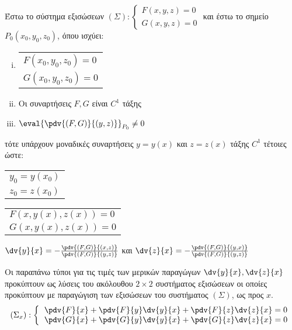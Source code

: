 \documentclass[a4paper,table]{report}
\begin{document}
Έστω το σύστημα εξισώσεων $(\Sigma):
\begin{cases}
  F(x,y,z) = 0  \\
  G(x,y,z) = 0
\end{cases}$
και έστω το σημείο $ P_0(x_0,y_0,z_0) $, όπου ισχύει:
\begin{enumerate}[(i)]
  \item  
    \begin{tabular}{l}
      $F(x_0,y_0,z_0) = 0$ \\
      $G(x_0,y_0,z_0) = 0$
    \end{tabular}
  \item Οι συναρτήσεις $ F, G $ είναι $ C^{1} $ τάξης 
  \item $ \eval{\pdv{(F,G)}{(y,z)}} _{P_{0}} \neq 0 $
\end{enumerate} 
τότε υπάρχουν μοναδικές συναρτήσεις $ y = y(x) $ και $ z = z(x) $ τάξης $ C^{1} $ 
τέτοιες ώστε:
\begin{myitemize}
  \item 
    \begin{tabular}{l}
      $ y_0 = y(x_0) $ \\
      $ z_0 = z(x_0) $
    \end{tabular}
  \item 
    \begin{tabular}{l}
      $ F(x,y(x),z(x)) = 0 $ \\
      $ G(x,y(x),z(x)) = 0 $
    \end{tabular}
  \item $ \dv{y}{x} = - \frac{\pdv{(F,G)}{(x,z)}}{\pdv{(F,G)}{(y,z)}} $ και 
    $ \dv{z}{x} = - \frac{\pdv{(F,G)}{(y,x)}}{\pdv{(F,G)}{(y,z)}} $
\end{myitemize}

\begin{rem}
  Οι παραπάνω τύποι για τις τιμές των μερικών παραγώγων $ \dv{y}{x}, \dv{z}{x}$ 
  προκύπτουν ως λύσεις του ακόλουθου $ 2 \times 2 $ συστήματος εξισώσεων οι οποίες 
  προκύπτουν με παραγώγιση των εξισώσεων του συστήματος $ (\Sigma) $, ως προς $x$.
  \renewcommand{\arraystretch}{2}
  \[
    \begin{aligned}
      (\Sigma_x): \left\{\begin{tabular}{l}
          $\pdv{F}{x} + \pdv{F}{y}\dv{y}{x} + \pdv{F}{z}\dv{z}{x} = 0$ \\
          $\pdv{G}{x} + \pdv{G}{y}\dv{y}{x} + \pdv{G}{z}\dv{z}{x} = 0$
        \end{tabular}
      \right.
    \end{aligned}
  \]
\end{rem}
\end{document}
